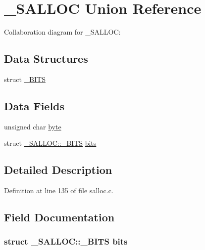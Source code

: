 \hypertarget{union___s_a_l_l_o_c}{}\section{\+\_\+\+S\+A\+L\+L\+O\+C Union Reference}
\label{union___s_a_l_l_o_c}


Collaboration diagram for \+\_\+\+S\+A\+L\+L\+O\+C\+:
\subsection*{Data Structures}
\begin{DoxyCompactItemize}
\item 
struct \hyperlink{struct___s_a_l_l_o_c_1_1___b_i_t_s}{\+\_\+\+B\+I\+T\+S}
\end{DoxyCompactItemize}
\subsection*{Data Fields}
\begin{DoxyCompactItemize}
\item 
unsigned char \hyperlink{union___s_a_l_l_o_c_a1581cde4f73c9a797ae1e7afcc1bb3de}{byte}
\item 
struct \hyperlink{struct___s_a_l_l_o_c_1_1___b_i_t_s}{\+\_\+\+S\+A\+L\+L\+O\+C\+::\+\_\+\+B\+I\+T\+S} \hyperlink{union___s_a_l_l_o_c_aae368bd4323b8800a98337ccade6ac66}{bits}
\end{DoxyCompactItemize}


\subsection{Detailed Description}


Definition at line 135 of file salloc.\+c.



\subsection{Field Documentation}
\hypertarget{union___s_a_l_l_o_c_aae368bd4323b8800a98337ccade6ac66}{}
\subsubsection[{bits}]{\setlength{\rightskip}{0pt plus 5cm}struct {\bf \+\_\+\+S\+A\+L\+L\+O\+C\+::\+\_\+\+B\+I\+T\+S} bits}\label{union___s_a_l_l_o_c_aae368bd4323b8800a98337ccade6ac66}
\hypertarget{union___s_a_l_l_o_c_a1581cde4f73c9a797ae1e7afcc1bb3de}{}
